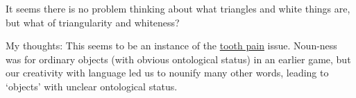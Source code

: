 It seems there is no problem thinking about what triangles and white things are, but what of triangularity and whiteness?

My thoughts: This seems to be an instance of the \href{doc/phil/PhilSituations/ToothPain}{tooth pain} issue. Noun-ness was for ordinary objects (with obvious ontological status) in an earlier game, but our creativity with language led us to nounify many other words, leading to `objects' with unclear ontological status.